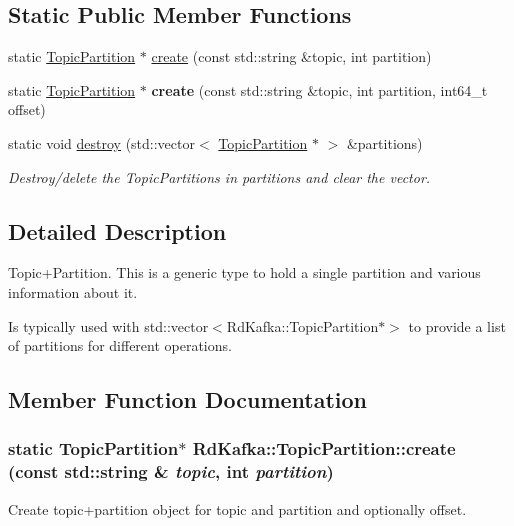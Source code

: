\subsection*{Static Public Member Functions}
\begin{DoxyCompactItemize}
\item 
static \hyperlink{classRdKafka_1_1TopicPartition}{TopicPartition} $\ast$ \hyperlink{classRdKafka_1_1TopicPartition_acb929236c0604a595e53154c3552d399}{create} (const std::string \&topic, int partition)
\item 
\hypertarget{classRdKafka_1_1TopicPartition_a6a51b78cb44ec64e4e425f96337bae41}{
static \hyperlink{classRdKafka_1_1TopicPartition}{TopicPartition} $\ast$ {\bfseries create} (const std::string \&topic, int partition, int64\_\-t offset)}
\label{classRdKafka_1_1TopicPartition_a6a51b78cb44ec64e4e425f96337bae41}

\item 
\hypertarget{classRdKafka_1_1TopicPartition_a0b9bdc4f29b886466f87ff8420d4e5b6}{
static void \hyperlink{classRdKafka_1_1TopicPartition_a0b9bdc4f29b886466f87ff8420d4e5b6}{destroy} (std::vector$<$ \hyperlink{classRdKafka_1_1TopicPartition}{TopicPartition} $\ast$ $>$ \&partitions)}
\label{classRdKafka_1_1TopicPartition_a0b9bdc4f29b886466f87ff8420d4e5b6}

\begin{DoxyCompactList}\small\item\em Destroy/delete the TopicPartitions in {\ttfamily partitions} and clear the vector. \item\end{DoxyCompactList}\end{DoxyCompactItemize}


\subsection{Detailed Description}
Topic+Partition. This is a generic type to hold a single partition and various information about it.

Is typically used with std::vector$<$RdKafka::TopicPartition$\ast$$>$ to provide a list of partitions for different operations. 

\subsection{Member Function Documentation}
\hypertarget{classRdKafka_1_1TopicPartition_acb929236c0604a595e53154c3552d399}{
\subsubsection[{create}]{\setlength{\rightskip}{0pt plus 5cm}static {\bf TopicPartition}$\ast$ RdKafka::TopicPartition::create (const std::string \& {\em topic}, \/  int {\em partition})}}
\label{classRdKafka_1_1TopicPartition_acb929236c0604a595e53154c3552d399}
Create topic+partition object for {\ttfamily topic} and {\ttfamily partition} and optionally {\ttfamily offset}.

